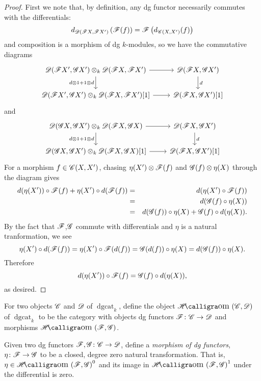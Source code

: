 \documentclass[dissertation.tex]{subfiles}
\begin{document}
\begin{prop}
\begin{proof}
    First we note that, by definition, any dg functor necessarily commutes with the differentials:
    $$d_{\mathscr{D}(\mathscr{F}X, \mathscr{F}X^\prime)}\left(\mathscr{F}(f) \right) = \mathscr{F}\left(d_{\mathscr{C}(X,X^\prime)}(f)\right)$$
    and composition is a morphism of dg $k$-modules, so we have the commutative diagrams
    $$\begin{tikzcd}
      \D(\F X^\prime, \G X^\prime) \otimes_k \D(\F X, \F X^\prime) \arrow{r}\arrow[swap]{d}{d \otimes 1 + 1 \otimes d}& \D(\F X, \G X^\prime)\arrow{d}{d}\\
      \D(\F X^\prime, \G X^\prime) \otimes_k \D(\F X, \F X^\prime)[1] \arrow{r}& \D(\F X, \G X^\prime)[1]
    \end{tikzcd}$$
    and
    $$\begin{tikzcd}
      \D(\G X, \G X^\prime) \otimes_k \D(\F X, \G X) \arrow{r}\arrow[swap]{d}{d \otimes 1 + 1 \otimes d}& \D(\F X, \G X^\prime)\arrow{d}{d}\\
      \D(\G X, \G X^\prime) \otimes_k \D(\F X, \G X)[1] \arrow{r}& \D(\F X, \G X^\prime)[1]
    \end{tikzcd}$$
    For a morphism $f \in \mathscr{C}(X,X^\prime)$, chasing $\eta(X^\prime) \otimes \mathscr{F}(f)$ and $\mathscr{G}(f) \otimes \eta(X)$ through the diagram gives
    \begin{eqnarray*}
      d(\eta(X^\prime)) \circ \mathscr{F}(f) + \eta(X^\prime) \circ d(\mathscr{F}(f)) 
      &=& d(\eta(X^\prime) \circ \mathscr{F}(f))\\
      &=& d(\mathscr{G}(f) \circ \eta(X))\\
      &=& d(\mathscr{G}(f)) \circ \eta(X) + \mathscr{G}(f) \circ d(\eta(X)).
    \end{eqnarray*}
    By the fact that $\mathscr{F}$,$\mathscr{G}$ commute with differentials and $\eta$ is a natural tranformation, we see
    $$\eta(X^\prime) \circ d(\mathscr{F}(f)) = \eta(X^\prime) \circ \mathscr{F}(d(f)) = \mathscr{G}(d(f)) \circ \eta(X) = d(\mathscr{G}(f)) \circ \eta(X).$$
    Therefore
    $$d(\eta(X^\prime)) \circ \mathscr{F}(f) = \mathscr{G}(f) \circ d(\eta(X)),$$
    as desired.
  \end{proof}
\end{prop}

\begin{defn}
  For two objects $\mathscr{C}$ and $\mathscr{D}$ of $\operatorname{dgcat}_k$, define the object $\SHom{\CC,\D}$ of $\operatorname{dgcat}_k$ to be the category with objects dg functors $\mathscr{F} \colon \mathscr{C} \rightarrow \mathscr{D}$ and morphisms $\SHom{\mathscr{F},\mathscr{G}}$.
  
  Given two dg functors $\mathscr{F},\mathscr{G} \colon \mathscr{C} \rightarrow \mathscr{D}$, define a {\it morphism of dg functors}, $\eta \colon \mathscr{F} \rightarrow \mathscr{G}$ to be a closed, degree zero natural transformation.
  That is, $\eta \in \SHom{\F, \G}^0$ and its image in $\SHom{\F,\G}^1$ under the differential is zero.
\end{defn}
\end{document}
